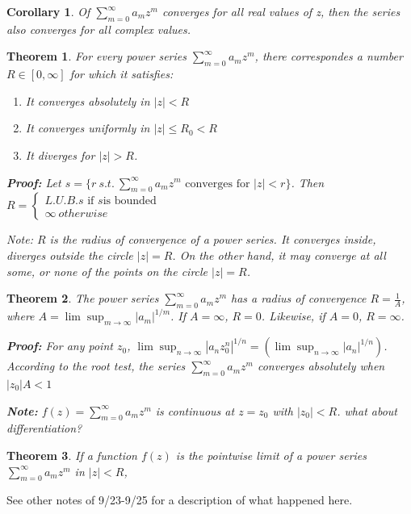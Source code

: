 \documentclass{article}
\newtheorem{theorem}{Theorem}[section]
\newtheorem{corollary}{Corollary}
\theoremstyle{definition}
\begin{document}
\begin{corollary}
Of $\sum_{m=0}^\infty a_m z^m$ converges for all real values of z, then the series also converges for all complex values.	\end{corollary}
\begin{theorem}
For every power series $\sum_{m=0}^\infty a_m z^m$, there correspondes a number $R \in [0, \infty]$ for which it satisfies:
\begin{enumerate}
	\item It converges absolutely in $|z| < R$
	\item It converges uniformly in $|z|\leq R_0 < R$ 
	\item It diverges for $|z|>R$.
\end{enumerate}

\textbf{Proof:} Let $s = \{r\ s.t.\ \sum_{m=0}^\infty a_m z^m\text{ converges for } |z|<r\}$. Then $R = \begin{cases}
L.U.B. s \text{ if } s \text{is bounded} \\ 
\infty \ otherwise
\end{cases}$

Note: $R$ is the radius of convergence of a power series. It converges inside, diverges outside the circle $|z| = R$. On the other hand, it may converge at all some, or none of the points on the circle $|z|=R$. 

\end{theorem}

\begin{theorem}
The power series $\sum_{m=0}^\infty a_m z^m$ has a radius of convergence $R = \frac{1}{A}$, where $A =\lim\sup_{m \to \infty } |a_m|^{1/m}$. If $A = \infty$, $R = 0$. Likewise, if $A=0$, $R = \infty$. 

\textbf{Proof:}
For any point $z_0$, $\lim\sup_{n \to \infty } |a_nz_0^n|^{1/n} = \left(\lim\sup_{n \to \infty }|a_n|^{1/n}\right)$. According to the root test, the series $\sum_{m=0}^\infty a_m z^m$ converges absolutely when $|z_0|A < 1$ 

\textbf{Note:} $f(z) = \sum_{m=0}^\infty a_m z^m$ is continuous at $z = z_0$ with $|z_0|<R$. what about differentiation?
\end{theorem}


\begin{theorem}
If a function $f(z)$ is the pointwise limit of a power series $\sum_{m=0}^\infty a_m z^m$ in $|z|<R$,
\end{theorem}
See other notes of 9/23-9/25 for a description of what happened here.
\end{document}
